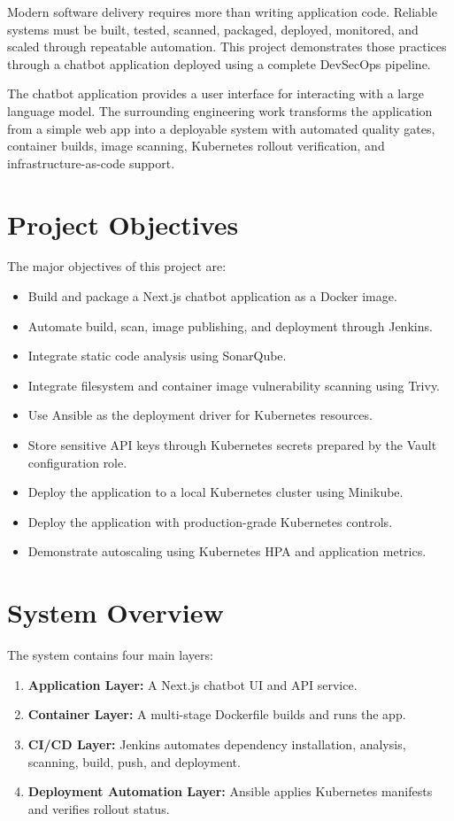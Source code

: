 \documentclass[12pt,a4paper]{article}
\begin{document}
Modern software delivery requires more than writing application code. Reliable
systems must be built, tested, scanned, packaged, deployed, monitored, and
scaled through repeatable automation. This project demonstrates those practices
through a chatbot application deployed using a complete DevSecOps pipeline.

The chatbot application provides a user interface for interacting with a large
language model. The surrounding engineering work transforms the application from
a simple web app into a deployable system with automated quality gates,
container builds, image scanning, Kubernetes rollout verification, and
infrastructure-as-code support.

\section{Project Objectives}

The major objectives of this project are:

\begin{itemize}[leftmargin=*]
    \item Build and package a Next.js chatbot application as a Docker image.
    \item Automate build, scan, image publishing, and deployment through Jenkins.
    \item Integrate static code analysis using SonarQube.
    \item Integrate filesystem and container image vulnerability scanning using Trivy.
    \item Use Ansible as the deployment driver for Kubernetes resources.
    \item Store sensitive API keys through Kubernetes secrets prepared by the Vault configuration role.
    \item Deploy the application to a local Kubernetes cluster using Minikube.
    \item Deploy the application with production-grade Kubernetes controls.
    \item Demonstrate autoscaling using Kubernetes HPA and application metrics.
\end{itemize}

\section{System Overview}

The system contains four main layers:

\begin{enumerate}[leftmargin=*]
    \item \textbf{Application Layer:} A Next.js chatbot UI and API service.
    \item \textbf{Container Layer:} A multi-stage Dockerfile builds and runs the app.
    \item \textbf{CI/CD Layer:} Jenkins automates dependency installation, analysis, scanning, build, push, and deployment.
    \item \textbf{Deployment Automation Layer:} Ansible applies Kubernetes manifests and verifies rollout status.
\end{enumerate}
\end{document}
